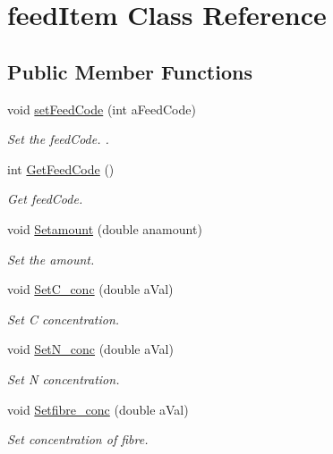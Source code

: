 \hypertarget{classfeed_item}{}\section{feed\+Item Class Reference}
\label{classfeed_item}
\subsection*{Public Member Functions}
\begin{DoxyCompactItemize}
\item 
void \mbox{\hyperlink{classfeed_item_a005d6dd8e2c2cb5a7ddf4f904690daf6}{set\+Feed\+Code}} (int a\+Feed\+Code)
\begin{DoxyCompactList}\small\item\em Set the feed\+Code. . \end{DoxyCompactList}\item 
int \mbox{\hyperlink{classfeed_item_a15fbee7c871fe05f99c22347981e072b}{Get\+Feed\+Code}} ()
\begin{DoxyCompactList}\small\item\em Get feed\+Code. \end{DoxyCompactList}\item 
void \mbox{\hyperlink{classfeed_item_a74cdd944c0859600cda02409e11d00a5}{Setamount}} (double anamount)
\begin{DoxyCompactList}\small\item\em Set the amount. \end{DoxyCompactList}\item 
void \mbox{\hyperlink{classfeed_item_acc5a752b15d91d6d457f2c6fb68f3ce7}{Set\+C\+\_\+conc}} (double a\+Val)
\begin{DoxyCompactList}\small\item\em Set C concentration. \end{DoxyCompactList}\item 
void \mbox{\hyperlink{classfeed_item_a86895df478a6843340ee4c75197b3ab0}{Set\+N\+\_\+conc}} (double a\+Val)
\begin{DoxyCompactList}\small\item\em Set N concentration. \end{DoxyCompactList}\item 
void \mbox{\hyperlink{classfeed_item_ab4acc78c49603c114df456a30b74ecba}{Setfibre\+\_\+conc}} (double a\+Val)
\begin{DoxyCompactList}\small\item\em Set concentration of fibre. \end{DoxyCompactList}\item 

\end{DoxyCompactItemize}
